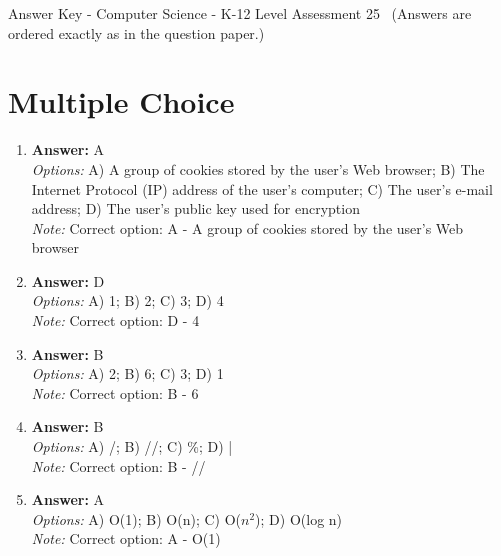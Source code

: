 \documentclass[12pt]{article}
\begin{document}
\begin{center}
Answer Key - Computer Science - K-12 Level Assessment 25 \
\small (Answers are ordered exactly as in the question paper.)
\end{center}

\section*{Multiple Choice}
\begin{enumerate}[label=\arabic*.]
\item \textbf{Answer:} A
\\ \textit{Options:} A) A group of cookies stored by the user's Web browser; B) The Internet Protocol (IP) address of the user's computer; C) The user's e-mail address; D) The user's public key used for encryption
\\ \textit{Note:} Correct option: A - A group of cookies stored by the user's Web browser
\item \textbf{Answer:} D
\\ \textit{Options:} A) 1; B) 2; C) 3; D) 4
\\ \textit{Note:} Correct option: D - 4
\item \textbf{Answer:} B
\\ \textit{Options:} A) 2; B) 6; C) 3; D) 1
\\ \textit{Note:} Correct option: B - 6
\item \textbf{Answer:} B
\\ \textit{Options:} A) /; B) //; C) \%; D) |
\\ \textit{Note:} Correct option: B - //
\item \textbf{Answer:} A
\\ \textit{Options:} A) O(1); B) O(n); C) O($n^2$); D) O(log n)
\\ \textit{Note:} Correct option: A - O(1)
\end{enumerate}
\end{document}
